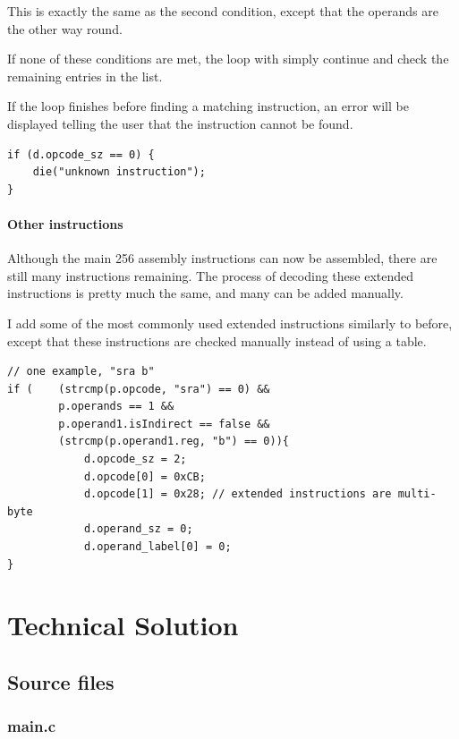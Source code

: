 \documentclass[a4paper]{report}
\begin{document}
This is exactly the same as the second condition, except that the operands are
the other way round.

If none of these conditions are met, the loop with simply continue and check the
remaining entries in the list.

If the loop finishes before finding a matching instruction, an error will be
displayed telling the user that the instruction cannot be found.

\begin{lstlisting}
if (d.opcode_sz == 0) {
	die("unknown instruction");
}
\end{lstlisting}

\subsubsection{Other instructions}

Although the main 256 assembly instructions can now be assembled, there are
still many instructions remaining. The process of decoding these extended
instructions is pretty much the same, and many can be added manually.

I add some of the most commonly used extended instructions similarly to before,
except that these instructions are checked manually instead of using a table.

\begin{lstlisting}
// one example, "sra b"
if (	(strcmp(p.opcode, "sra") == 0) &&
		p.operands == 1 &&
		p.operand1.isIndirect == false &&
		(strcmp(p.operand1.reg, "b") == 0)){
			d.opcode_sz = 2;
			d.opcode[0] = 0xCB;
			d.opcode[1] = 0x28; // extended instructions are multi-byte
			d.operand_sz = 0;
			d.operand_label[0] = 0;
}
\end{lstlisting}


\chapter{Technical Solution}

\section{Source files}

\lstset{numbers=left}

\subsection{main.c}

\end{document}
